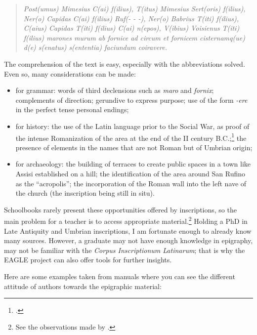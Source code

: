 \documentclass[amsthm,ebook]{saparticle}
\begin{document}
\begin{quotation}
\emph{Post(umus) Mimesius C(ai) f(ilius), T(itus) Mimesius Sert(oris) f(ilius), Ner(o) Capidas C(ai) f(ilius) Ruf(- - -),
Ner(o) Babrius T(iti) f(ilius), C(aius) Capidas T(iti) f(ilius) C(ai) n(epos), V(ibius) Voisienus T(iti) f(ilius)
marones murum ab fornice ad circum et fornicem cisternamq(ue) d(e) s(enatus) s(ententia) faciundum coiravere.}

\end{quotation}
The comprehension of the text is easy, especially with the abbreviations solved. Even so, many considerations can be
made:

\begin{itemize}
\item for grammar: words of third declensions such as \emph{maro} and \emph{fornix}; complements of direction; gerundive to express
purpose; use of the form {}\emph{-ere} in the perfect tense personal endings;
\item for history: the use of the Latin language prior to the Social War, as proof of the intense Romanization of the
area at the end of the II century B.C.;\footnote{\citet{Coarelli1991}.} the presence of elements in the names that are not
Roman but of Umbrian origin;
\item for archaeology: the building of terraces to create public spaces in a town like Assisi established on a hill; the
identification of the area around San Rufino as the ``acropolis''; the incorporation of the Roman wall into the left nave
of the church (the inscription being still in situ).
\end{itemize}



Schoolbooks rarely present these opportunities offered by inscriptions, so the main problem for a teacher is to access
appropriate material.\footnote{ See the observations made by \citet{Carpenter2006}.} Holding a PhD in Late Antiquity and
Umbrian inscriptions, I am fortunate enough to already know many sources. However, a graduate may not have enough
knowledge in epigraphy, may not be familiar with the \emph{Corpus Inscriptionum Latinarum}; that is why the EAGLE project can
also offer tools for further insights.

Here are some examples taken from manuals where you can see the different attitude of authors towards the epigraphic
material:
\end{document}

